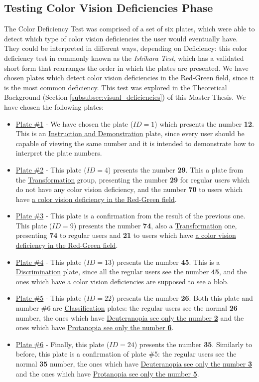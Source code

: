 \subsection{Testing Color Vision Deficiencies Phase}
\label{subsec:design_ishihara}
%
The Color Deficiency Test was comprised of a set of six plates, which were able to detect which type of color vision deficiencies the user
would eventually have. They could be interpreted in different ways, depending on Deficiency: this color deficiency test in commonly known as the
\emph{Ishihara Test}, which has a validated \cite{Alwis1992} short form that rearranges the order in which the plates are presented. We have chosen plates
which detect color vision deficiencies in the Red-Green field, since it is the most common deficiency. This test was explored
in the Theoretical Background (Section \ref{subsubsec:visual_deficiencies}) of this Master Thesis. We have chosen the following plates:
%
\begin{itemize}
	\setlength\itemsep{0.01em}
	\item \ul{Plate \#1} - We have chosen the plate ($ID = 1$) which presents the number \textbf{12}. This is an \ul{Instruction and
	Demonstration} plate, since every user should be capable of viewing the same number and it is intended to demonstrate how to interpret the plate numbers.
	\item \ul{Plate \#2} - This plate ($ID = 4$) presents the number \textbf{29}. This a plate from the \ul{Transformation} group, presenting the number
	\textbf{29} for regular	users which do not have any color vision deficiency, and the number \textbf{70} to users which have \ul{a color vision
	deficiency in the Red-Green field}.
	\item \ul{Plate \#3} - This plate is a confirmation from the result of the previous one. This plate ($ID = 9$) presents the number \textbf{74}, also a
	\ul{Transformation} one, presenting \textbf{74} to regular users and \textbf{21} to users which have \ul{a color vision deficiency in the Red-Green field}.
	\item \ul{Plate \#4} - This plate ($ID = 13$) presents the number \textbf{45}. This is a \ul{Discrimination} plate, since all the regular users see the
	number \textbf{45}, and	the ones which have a color vision deficiencies are supposed to see a blob.
	\item \ul{Plate \#5} - This plate ($ID = 22$) presents the number \textbf{26}. Both this plate and number \#6 are \ul{Classification} plates: the regular users see the
	normal \textbf{26} number, the ones which have \ul{Deuteranopia see only the number \textbf{2}} and the ones which have \ul{Protanopia see only the number
	\textbf{6}}.
	\item \ul{Plate \#6} - Finally, this plate ($ID = 24$) presents the number \textbf{35}. Similarly to before, this plate is a confirmation of plate \#5: the regular users
	see the normal \textbf{35} number, the ones which have \ul{Deuteranopia see only the number \textbf{3}} and the ones which have \ul{Protanopia see
	only the number \textbf{5}}.
\end{itemize}
